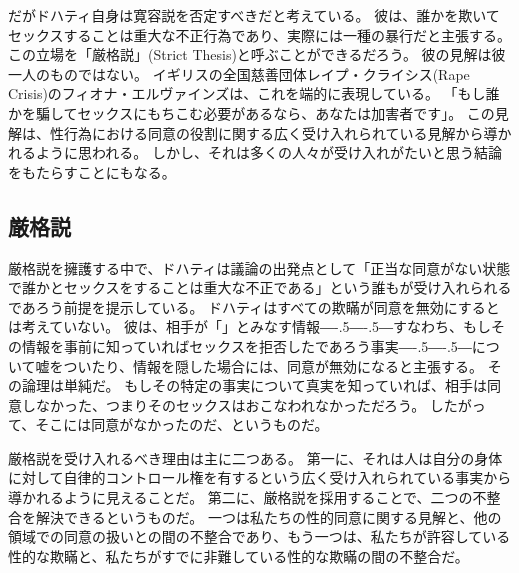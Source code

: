 \documentclass[paper=a4,book,openany]{jlreq}
\def\DDASH{―\kern-.5\zw―\kern-.5\zw―} %
\begin{document}
だがドハティ自身は寛容説を否定すべきだと考えている。
彼は、誰かを欺いてセックスすることは重大な不正行為であり、実際には一種の暴行だと主張する。
この立場を「厳格説」(Strict Thesis)と呼ぶことができるだろう。
彼の見解は彼一人のものではない。
イギリスの全国慈善団体レイプ・クライシス(Rape Crisis)のフィオナ・エルヴァインズは、これを端的に表現している。
「もし誰かを騙してセックスにもちこむ必要があるなら、あなたは加害者です」\citep{sanghani14:_lied_your_way_sex}。
この見解は、性行為における同意の役割に関する広く受け入れられている見解から導かれるように思われる。
しかし、それは多くの人々が受け入れがたいと思う結論をもたらすことにもなる。

\subsection{厳格説}

厳格説を擁護する中で、ドハティは議論の出発点として「正当な同意がない状態で誰かとセックスをすることは重大な不正である」という誰もが受け入れられるであろう前提を提示している\citep[p.722]{dougherty13:_sex_lies_consen}。
ドハティはすべての欺瞞が同意を無効にするとは考えていない。
彼は、相手が「」とみなす情報{\DDASH}すなわち、もしその情報を事前に知っていればセックスを拒否したであろう事実{\DDASH}について嘘をついたり、情報を隠した場合には、同意が無効になると主張する。
その論理は単純だ。
もしその特定の事実について真実を知っていれば、相手は同意しなかった、つまりそのセックスはおこなわれなかっただろう。
したがって、そこには同意がなかったのだ、というものだ。

厳格説を受け入れるべき理由は主に二つある。
第一に、それは人は自分の身体に対して自律的コントロール権を有するという広く受け入れられている事実から導かれるように見えることだ。
第二に、厳格説を採用することで、二つの不整合を解決できるというものだ。
一つは私たちの性的同意に関する見解と、他の領域での同意の扱いとの間の不整合であり、もう一つは、私たちが許容している性的な欺瞞と、私たちがすでに非難している性的な欺瞞の間の不整合だ。
\end{document}

